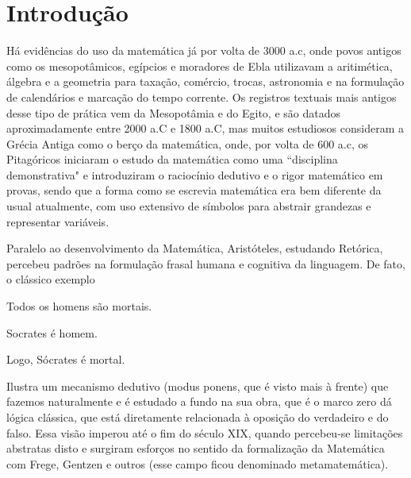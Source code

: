 \chapter{Introdução}


Há evidências do uso da matemática já por volta de 3000 a.c, onde povos antigos como os mesopotâmicos, egípcios e moradores de Ebla utilizavam a aritimética, álgebra e a geometria para taxação, comércio, trocas, astronomia e na formulação de calendários e marcação do tempo corrente.
Os registros textuais mais antigos desse tipo de prática vem da Mesopotâmia e do Egito, e são datados aproximadamente entre 2000 a.C e 1800 a.C, mas muitos estudiosos consideram a Grécia Antiga como o berço da matemática, onde, por volta de 600 a.c, os Pitagóricos iniciaram o estudo da matemática como uma ``disciplina demonstrativa" e introduziram o raciocínio dedutivo e o rigor matemático em provas, sendo que a forma como se escrevia matemática era bem diferente da usual atualmente, com uso extensivo de símbolos para abstrair grandezas e representar variáveis.

Paralelo ao desenvolvimento da Matemática, Aristóteles, estudando Retórica, percebeu padrões na formulação frasal humana e cognitiva da linguagem. De fato, o clássico exemplo
\vspace{0.3cm}

Todos os homens são mortais. \par
Socrates é homem. \par
Logo, Sócrates é mortal.

\vspace{0.3cm}


Ilustra um mecanismo dedutivo (modus ponens, que é visto mais à frente) que fazemos naturalmente e é estudado a fundo na sua obra, que é o marco zero dá lógica clássica, que está diretamente relacionada à oposição do verdadeiro e do falso. Essa visão imperou até o fim do século XIX, quando percebeu-se limitações abstratas disto e surgiram esforços no sentido da formalização da Matemática com Frege, Gentzen e outros (esse campo ficou denominado metamatemática).

